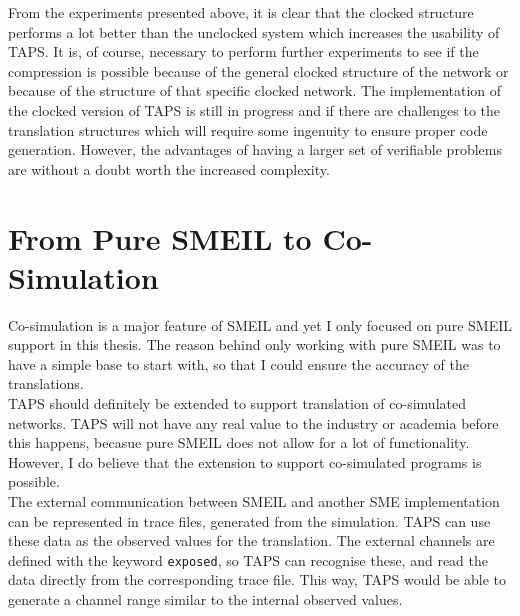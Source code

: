 From the experiments presented above, it is clear that the clocked structure performs a lot better than the unclocked system which increases the usability of TAPS. It is, of course, necessary to perform further experiments to see if the compression is possible because of the general clocked structure of the network or because of the structure of that specific clocked network.
The implementation of the clocked version of TAPS is still in progress and if there are challenges to the translation structures which will require some ingenuity to ensure proper code generation. However, the advantages of having a larger set of verifiable problems are without a doubt worth the increased complexity.
\section{From Pure SMEIL to Co-Simulation}
Co-simulation is a major feature of SMEIL and yet I only focused on pure SMEIL support in this thesis. The reason behind only working with pure SMEIL was to have a simple base to start with, so that I could ensure the accuracy of the translations.\\


TAPS should definitely be extended to support translation of co-simulated networks. TAPS will not have any real value to the industry or academia before this happens, becasue pure SMEIL does not allow for a lot of functionality. However, I do believe that the extension to support co-simulated programs is possible.\\

The external communication between SMEIL and another SME implementation can be represented in trace files, generated from the simulation. TAPS can use these data as the observed values for the translation. The external channels are defined with the keyword \texttt{exposed}, so TAPS can recognise these, and read the data directly from the corresponding trace file. This way, TAPS would be able to generate a channel range similar to the internal observed values.

